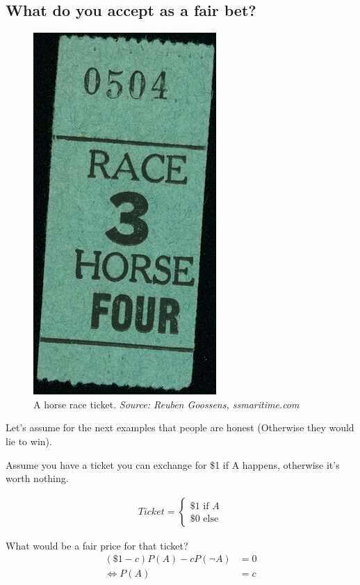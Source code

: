 \documentclass[../main/Notes.tex]{subfiles}
\begin{document}
\subsection{What do you accept as a fair bet?}
\begin{figure}[ht]
  \begin{center}
    \includegraphics[]{../images/Oronsay-Rick-Danley-Horse-Race-ticket-June-30.jpg}
    \caption{A horse race ticket. \textit{Source: Reuben Goossens, ssmaritime.com}}
    \label{fig:raceticket}
  \end{center}
\end{figure}

Let's assume for the next examples that people are honest (Otherwise they would lie to win).

Assume you have a ticket you can exchange for \$1 if A happens, otherwise it's worth nothing.

\begin{align*}
Ticket = 
  \begin{cases}
    \$1 \mbox{ if } A \\
    \$0 \mbox{ else}
  \end{cases}
\end{align*}

What would be a fair price for that ticket?
\begin{align*}
\left(\$1 - c\right) P(A) - cP(\neg A) &= 0 \\
\Leftrightarrow P(A) &= c
\end{align*}
\end{document}
